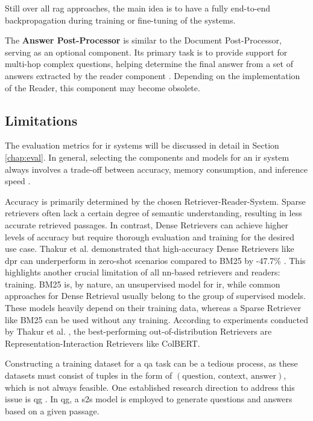Still over all \gls{rag} approaches, the main idea is to have a fully end-to-end backpropagation during training or fine-tuning of the systems.

The \textbf{Answer Post-Processor} is similar to the Document Post-Processor, serving as an optional component. Its primary task is to provide support for multi-hop complex questions, helping determine the final answer from a set of answers extracted by the reader component \cite{zhu_retrieving_2021}. Depending on the implementation of the Reader, this component may become obsolete.


\subsection{Limitations}
\label{subsec:qa_limitations}

The evaluation metrics for \gls{ir} systems will be discussed in detail in Section \ref{chap:eval}. In general, selecting the components and models for an \gls{ir} system always involves a trade-off between accuracy, memory consumption, and inference speed \cite{zhang_survey_2023}.

Accuracy is primarily determined by the chosen Retriever-Reader-System. Sparse retrievers often lack a certain degree of semantic understanding, resulting in less accurate retrieved passages. In contrast, Dense Retrievers can achieve higher levels of accuracy but require thorough evaluation and training for the desired use case. Thakur et al. demonstrated that high-accuracy Dense Retrievers like \gls{dpr} can underperform in zero-shot scenarios compared to BM25 by -47.7\% \cite{thakur_beir_2021}. This highlights another crucial limitation of all \gls{nn}-based retrievers and readers: training. BM25 is, by nature, an unsupervised model for \gls{ir}, while common approaches for Dense Retrieval usually belong to the group of supervised models. These models heavily depend on their training data, whereas a Sparse Retriever like BM25 can be used without any training. According to experiments conducted by Thakur et al. \cite{thakur_beir_2021}, the best-performing out-of-distribution Retrievers are Representation-Interaction Retrievers like ColBERT.

Constructing a training dataset for a \gls{qa} task can be a tedious process, as these datasets must consist of tuples in the form of $(\text{question, context, answer})$, which is not always feasible. One established research direction to address this issue is \gls{qg} \cite{serban_generating_2016}. In \gls{qg}, a \gls{s2s} model is employed to generate questions and answers based on a given passage.

